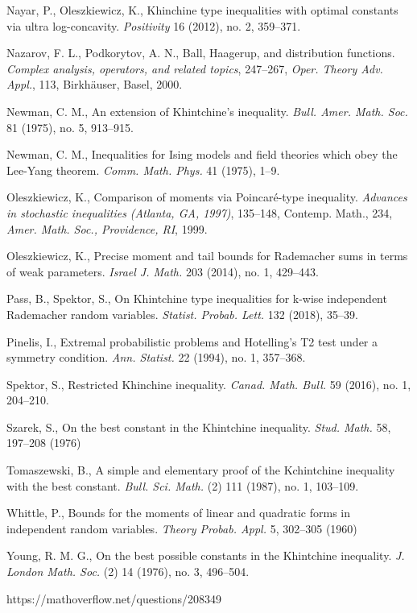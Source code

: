 \documentclass[10pt]{article}
\newcommand{\1}{\textbf{1}}
\theoremstyle{remark}
\theoremstyle{definition}
\begin{document}
\begin{thebibliography}{9}
Nayar, P., Oleszkiewicz, K.,
Khinchine type inequalities with optimal constants via ultra log-concavity.
\emph{Positivity} 16 (2012), no. 2, 359--371. 

Nazarov, F. L., Podkorytov, A. N.,
Ball, Haagerup, and distribution functions.
\emph{Complex analysis, operators, and related topics}, 247--267, 
\emph{Oper. Theory Adv. Appl.}, 113, Birkh\"auser, Basel, 2000. 

Newman, C. M.,
An extension of Khintchine's inequality.
\emph{Bull. Amer. Math. Soc.} 81 (1975), no. 5, 913--915.

Newman, C. M.,
Inequalities for Ising models and field theories which obey the Lee-Yang theorem.
\emph{Comm. Math. Phys.} 41 (1975), 1--9.

Oleszkiewicz, K.,
Comparison of moments via Poincar\'e-type inequality.
\emph{Advances in stochastic inequalities (Atlanta, GA, 1997)}, 135--148, 
Contemp. Math., 234, \emph{Amer. Math. Soc., Providence, RI}, 1999. 


Oleszkiewicz, K.,
Precise moment and tail bounds for Rademacher sums in terms of weak parameters. 
\emph{Israel J. Math.} 203 (2014), no. 1, 429--443. 


Pass, B., Spektor, S.,
On Khintchine type inequalities for k-wise independent Rademacher random variables.
\emph{Statist. Probab. Lett.} 132 (2018), 35--39.

Pinelis, I.,
Extremal probabilistic problems and Hotelling's T2 test under a symmetry condition. 
\emph{Ann. Statist.} 22 (1994), no. 1, 357--368.


Spektor, S.,
Restricted Khinchine inequality. 
\emph{Canad. Math. Bull.} 59 (2016), no. 1, 204--210.

Szarek, S.,
On the best constant in the Khintchine inequality.
\emph{Stud. Math.} 58, 197--208 (1976)

Tomaszewski, B.,
A simple and elementary proof of the Kchintchine inequality with the best constant. \emph{Bull. Sci. Math.} (2) 111 (1987), no. 1, 103--109.

Whittle, P.,
Bounds for the moments of linear and quadratic forms in independent random variables. \emph{Theory Probab. Appl.} 5, 302--305 (1960)

Young, R. M. G., On the best possible constants in the Khintchine inequality. \emph{J. London Math. Soc.} (2) 14 (1976), no. 3, 496--504.

https://mathoverflow.net/questions/208349

\end{thebibliography}
\end{document}
